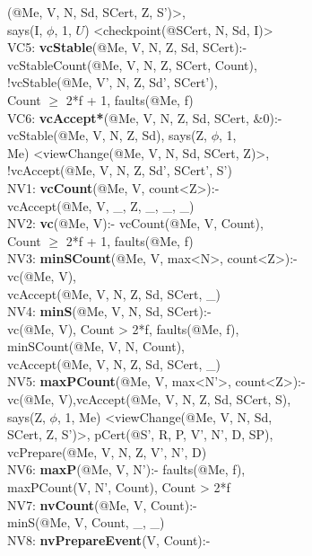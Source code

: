 \begin{code}
\> (@Me, V, N, Sd, SCert, Z, S')>,\\
\> says(I, $\phi$, 1, $U$) <checkpoint(@SCert, N, Sd, I)>\\
VC5: \textbf{vcStable}(@Me, V, N, Z, Sd, SCert):-\\
\> vcStableCount(@Me, V, N, Z, SCert, Count),\\
\> !vcStable(@Me, V', N, Z, Sd', SCert'),\\
\> Count $\geq$ 2*f + 1, faults(@Me, f)\\
VC6: \textbf{vcAccept*}(@Me, V, N, Z, Sd, SCert, $\&0$):-\\
\> vcStable(@Me, V, N, Z, Sd), says(Z, $\phi$, 1, \\
\> Me) <viewChange(@Me, V, N, Sd, SCert, Z)>,\\
\> !vcAccept(@Me, V, N, Z, Sd', SCert', S')\\
NV1: \textbf{vcCount}(@Me, V, count<Z>):-\\
\> vcAccept(@Me, V, \_, Z, \_, \_, \_)\\
NV2: \textbf{vc}(@Me, V):- vcCount(@Me, V, Count),\\
\> Count $\geq$ 2*f + 1, faults(@Me, f)\\
NV3: \textbf{minSCount}(@Me, V, max<N>, count<Z>):- \\
\> vc(@Me, V),\\
\> vcAccept(@Me, V, N, Z, Sd, SCert, \_)\\
NV4: \textbf{minS}(@Me, V, N, Sd, SCert):- \\
\> vc(@Me, V), Count > 2*f, faults(@Me, f),\\
\> minSCount(@Me, V, N, Count), \\
\> vcAccept(@Me, V, N, Z, Sd, SCert, \_)\\
NV5: \textbf{maxPCount}(@Me, V, max<N'>, count<Z>):- \\
\> vc(@Me, V),vcAccept(@Me, V, N, Z, Sd, SCert, S),\\
\> says(Z, $\phi$, 1, Me) <viewChange(@Me, V, N, Sd, \\
\> SCert, Z, S')>, pCert(@S', R, P, V', N', D, SP),\\
\> vcPrepare(@Me, V, N, Z, V', N', D)\\
NV6: \textbf{maxP}(@Me, V, N'):- faults(@Me, f),\\
\> maxPCount(V, N', Count), Count > 2*f \\
NV7: \textbf{nvCount}(@Me, V, Count):-\\
\> minS(@Me, V, Count, \_, \_)\\
NV8: \textbf{nvPrepareEvent}(V, Count):-\\

\end{code}

